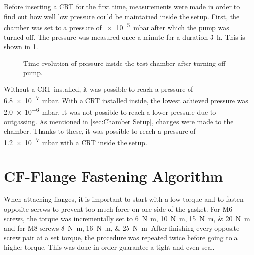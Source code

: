 Before inserting a CRT for the first time, measurements were made in order to find out how well low pressure could be maintained inside the setup. First, the chamber was set to a pressure of \SI{e-5}{\milli\bar} after which the pump was turned off. The pressure was measured once a minute for a duration \SI{3}{\hour}. This is shown in \cref{fig:Time evolution of pressure inside the test chamber after turning off pump}.

\begin{figure}[ht]
	\centering
		
	\begin{tikzpicture}
		
	\end{tikzpicture}
	
	\caption{Time evolution of pressure inside the test chamber after turning off pump.}
	\label{fig:Time evolution of pressure inside the test chamber after turning off pump}
\end{figure}

Without a CRT installed, it was possible to reach a pressure of \SI{6.8e-7}{\milli\bar}. With a CRT installed inside, the lowest achieved pressure was \SI{2.0e-6}{\milli\bar}. It was not possible to reach a lower pressure due to outgassing. As mentioned in \cref{sec:Chamber Setup}, changes were made to the chamber. Thanks to these, it was possible to reach a pressure of \SI{1.2e-7}{\milli\bar} with a CRT inside the setup.

\section{CF-Flange Fastening Algorithm}
\label{sec:CF-Flange Fastening Algorithm}

When attaching flanges, it is important to start with a low torque and to fasten opposite screws to prevent too much force on one side of the gasket. For M6 screws, the torque was incrementally set to \SIlist{6;10;15;20}{\newton\meter} and for M8 screws \SIlist{8;16;25}{\newton\meter}. After finishing every opposite screw pair at a set torque, the procedure was repeated twice before going to a higher torque. This was done in order guarantee a tight and even seal.